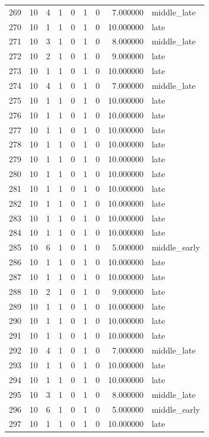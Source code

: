 \begin{longtable}{rrrrrrrrl}
269 & 10 & 4 & 1 & 0 & 1 & 0 & 7.000000 & middle\_late \\
270 & 10 & 1 & 1 & 0 & 1 & 0 & 10.000000 & late \\
271 & 10 & 3 & 1 & 0 & 1 & 0 & 8.000000 & middle\_late \\
272 & 10 & 2 & 1 & 0 & 1 & 0 & 9.000000 & late \\
273 & 10 & 1 & 1 & 0 & 1 & 0 & 10.000000 & late \\
274 & 10 & 4 & 1 & 0 & 1 & 0 & 7.000000 & middle\_late \\
275 & 10 & 1 & 1 & 0 & 1 & 0 & 10.000000 & late \\
276 & 10 & 1 & 1 & 0 & 1 & 0 & 10.000000 & late \\
277 & 10 & 1 & 1 & 0 & 1 & 0 & 10.000000 & late \\
278 & 10 & 1 & 1 & 0 & 1 & 0 & 10.000000 & late \\
279 & 10 & 1 & 1 & 0 & 1 & 0 & 10.000000 & late \\
280 & 10 & 1 & 1 & 0 & 1 & 0 & 10.000000 & late \\
281 & 10 & 1 & 1 & 0 & 1 & 0 & 10.000000 & late \\
282 & 10 & 1 & 1 & 0 & 1 & 0 & 10.000000 & late \\
283 & 10 & 1 & 1 & 0 & 1 & 0 & 10.000000 & late \\
284 & 10 & 1 & 1 & 0 & 1 & 0 & 10.000000 & late \\
285 & 10 & 6 & 1 & 0 & 1 & 0 & 5.000000 & middle\_early \\
286 & 10 & 1 & 1 & 0 & 1 & 0 & 10.000000 & late \\
287 & 10 & 1 & 1 & 0 & 1 & 0 & 10.000000 & late \\
288 & 10 & 2 & 1 & 0 & 1 & 0 & 9.000000 & late \\
289 & 10 & 1 & 1 & 0 & 1 & 0 & 10.000000 & late \\
290 & 10 & 1 & 1 & 0 & 1 & 0 & 10.000000 & late \\
291 & 10 & 1 & 1 & 0 & 1 & 0 & 10.000000 & late \\
292 & 10 & 4 & 1 & 0 & 1 & 0 & 7.000000 & middle\_late \\
293 & 10 & 1 & 1 & 0 & 1 & 0 & 10.000000 & late \\
294 & 10 & 1 & 1 & 0 & 1 & 0 & 10.000000 & late \\
295 & 10 & 3 & 1 & 0 & 1 & 0 & 8.000000 & middle\_late \\
296 & 10 & 6 & 1 & 0 & 1 & 0 & 5.000000 & middle\_early \\
297 & 10 & 1 & 1 & 0 & 1 & 0 & 10.000000 & late \\

\end{longtable}
